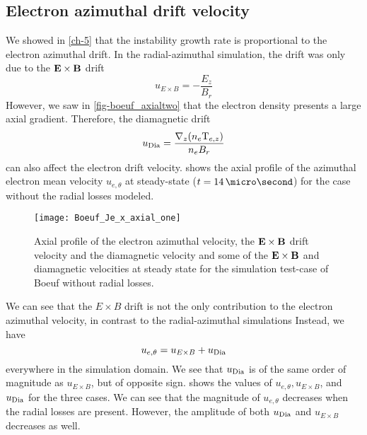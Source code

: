 
  \subsection{Electron azimuthal drift velocity} \label{subsec-drift}

  We showed in \cref{ch-5} that the instability growth rate is proportional to the electron azimuthal drift.
  In the radial-azimuthal simulation, the drift was only due to the ${\mathbf E} \times {\mathbf B}$ drift
  \begin{equation} \label{eq-exbdrift}
    u_{E \times B} = - \frac{E_z}{B_r}
  \end{equation}
  However, we saw in \cref{fig-boeuf_axialtwo} that the electron density presents a large axial gradient.
  Therefore, the diamagnetic drift
  $$u_{\rm Dia}=\frac{\nabla_z (n_e {\rm T}_{e,z})}{n_e B_r}$$
  can also affect the electron drift velocity.
   shows the axial profile of the azimuthal electron mean velocity $u_{e, \theta}$ at steady-state ($t = 14\,\micro\second$) for the case without the radial losses modeled.

 
  \begin{figure}[hbt]
    \centering
    \texttt{[image: Boeuf\_Je\_x\_axial\_one]}
    \caption{Axial profile of the electron azimuthal velocity, the ${\mathbf E} \times {\mathbf B}$ drift velocity and the diamagnetic velocity and some of the ${\mathbf E} \times {\mathbf B}$ and diamagnetic velocities at steady state for the simulation test-case of Boeuf without radial losses.}
    \label{fig-Jetheta_sum}
  \end{figure}
  
  We can see that the $E \times B$ drift is not the only contribution to the electron azimuthal velocity, in contrast to the radial-azimuthal simulations
  Instead, we have 
  $$ u_{e, \theta} =   u_{E \times B} + u_{\rm Dia}$$
  everywhere in the simulation domain.
  We see that $u_{\rm Dia}$ is of the same order of magnitude as $u_{E \times B}$, but of opposite sign.
   shows the values of $ u_{e, \theta},   u_{E \times B}$, and $u_{\rm Dia}$ for the three cases.
  We can see that the magnitude of $u_{e, \theta} $ decreases when the radial losses are present.
  However, the amplitude of both $u_{\rm Dia}$ and $u_{E \times B}$ decreases as well.

